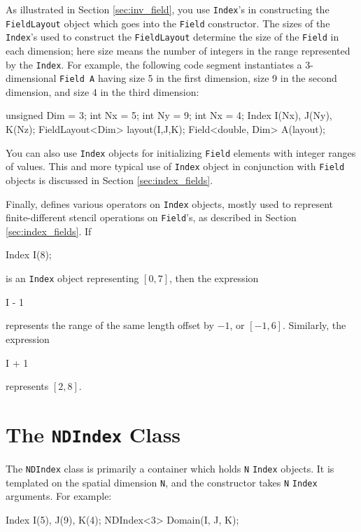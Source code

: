 As illustrated in Section \ref{sec:inv_field}, you use \texttt{Index}'s in constructing the \texttt{FieldLayout} object which goes into the \texttt{Field} constructor. The sizes of the \texttt{Index}'s used to construct the \texttt{FieldLayout} determine the size of the \texttt{Field} in each dimension; here size means the number of integers in the range represented by the \texttt{Index}. For example, the following code segment instantiates a 3-dimensional \texttt{Field A} having size 5 in the first dimension, size 9 in the second dimension, and size 4 in the
third dimension: \\
\begin{code}
unsigned Dim = 3;
int Nx = 5;
int Ny = 9;
int Nx = 4;
Index I(Nx), J(Ny), K(Nz);
FieldLayout<Dim> layout(I,J,K);
Field<double, Dim> A(layout);
\end{code}

You can also use \texttt{Index} objects for initializing \texttt{Field} elements with integer ranges of values. This and more typical use of \texttt{Index} object in conjunction with \texttt{Field} objects is discussed in Section \ref{sec:index_fields}.

Finally, \ippl defines various operators on \texttt{Index} objects, mostly used to represent finite-different stencil operations on \texttt{Field}'s, as described in Section \ref{sec:index_fields}. If
\begin{smallcode}
Index I(8);
\end{smallcode}
is an \texttt{Index} object representing $[0,7]$, then the expression
\begin{smallcode}
I - 1
\end{smallcode}
represents the range of the same length offset by $-1$, or $[-1,6]$. Similarly, the expression
\begin{smallcode}
I + 1
\end{smallcode}
represents $[2,8]$.

\section{The \texttt{NDIndex} Class}

The \texttt{NDIndex} class is primarily a container which holds \texttt{N} \texttt{Index} objects. It is templated on the spatial dimension \texttt{N}, and the constructor takes \texttt{N} \texttt{Index} arguments. For example: 
\begin{smallcode}
Index I(5), J(9), K(4);
NDIndex<3> Domain(I, J, K);
\end{smallcode}

